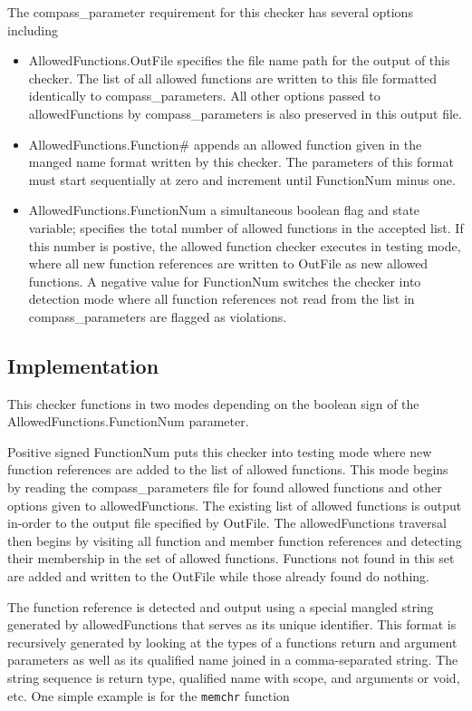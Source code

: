 The compass\_parameter requirement for this checker has several options
including
%
\begin{itemize}
\item AllowedFunctions.OutFile specifies the file name path for the output of
	this checker. The list of all allowed functions are written to this
	file formatted identically to compass\_parameters. All other options
	passed to allowedFunctions by compass\_parameters is also preserved 
	in this output file.
\item AllowedFunctions.Function\# appends an allowed function given in the
	manged name format written by this checker. The parameters of this
	format must start sequentially at zero and increment until
	FunctionNum minus one.
\item AllowedFunctions.FunctionNum a simultaneous boolean flag and state
	variable; specifies the total number of allowed functions in the
	accepted list. If this number is postive, the allowed function checker
	executes in testing mode, where all new function references are written
	to OutFile as new allowed functions. A negative value for FunctionNum
	switches the checker into detection mode where all function references
	not read from the list in compass\_parameters are flagged as 
	violations.
\end{itemize}

\subsection{Implementation}

This checker functions in two modes depending on the boolean sign of the
AllowedFunctions.FunctionNum parameter. 

Positive signed FunctionNum puts 
this checker into testing mode where new function references are added to
the list of allowed functions. This mode begins by reading the 
compass\_parameters file for found allowed functions and other options
given to allowedFunctions. The existing list of allowed functions is output
in-order to the output file specified by OutFile. The allowedFunctions
traversal then begins by visiting all function and member function references
and detecting their membership in the set of allowed functions. Functions
not found in this set are added and written to the OutFile while those already 
found do nothing. 

The function reference is detected and output using a special
mangled string generated by allowedFunctions that serves as its unique
identifier. This format is recursively generated by looking at the types of
a functions return and argument parameters as well as its qualified name
joined in a comma-separated string. The string sequence is return type, 
qualified name with scope, and arguments or void, etc. 
One simple example is for the {\tt memchr} function

